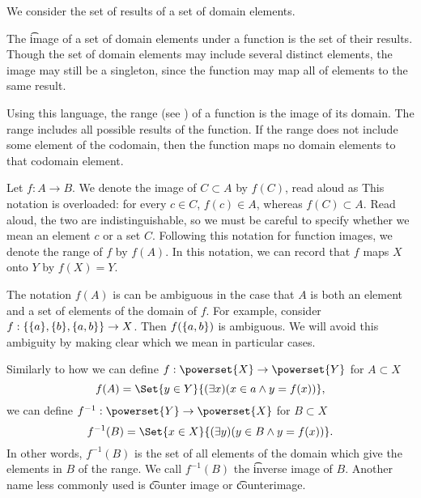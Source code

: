 

We consider the set of results of a set of domain elements.


The \t{image} of a set of domain elements under a function is the set of their results.
Though the set of domain elements may include several distinct elements, the image may still be a singleton, since the function may map all of elements to the same result.

Using this language, the range (see ) of a function is the image of its domain.
The range includes all possible results of the function.
If the range does not include some element of the codomain, then the function maps no domain elements to that codomain element.


Let $f: A \to B$.
We denote the image of $C \subset A$ by $f(C)$, read aloud as 
This notation is overloaded: for every $c \in C$, $f(c) \in A$, whereas $f(C) \subset A$.
Read aloud, the two are indistinguishable, so we must be careful to specify whether we mean an element $c$ or a set $C$.
Following this notation for function images, we denote the range of $f$ by $f(A)$.
In this notation, we can record that $f$ maps $X$ onto $Y$ by $f(X) = Y$.


The notation $f(A)$ is can be ambiguous in the case that $A$ is both an element and a set of elements of the domain of $f$.
For example, consider $f: \{\{a\}, \{b\}, \{a, b\}\} \to X$.
Then $f(\{a, b\})$ is ambiguous.
We will avoid this ambiguity by making clear which we mean in particular cases.



Similarly to how we can define $f: \powerset{X} \to \powerset{Y}$ for $A \subset X$
\[
  f(A) = \Set{y \in Y}{(\exists x)(x \in a \land y = f(x))},
\]
we can define $f^{-1}: \powerset{Y} \to \powerset{X}$ for $B \subset X$
\[
  f^{-1}(B) = \Set{x \in X}{(\exists y)(y \in B \land y = f(x))}.
\]
In other words, $f^{-1}(B)$ is the set of all elements of the domain which give the elements in $B$ of the range.
We call $f^{-1}(B)$ the \t{inverse image} of $B$.
Another name less commonly used is \t{counter image} or \t{counterimage}.

